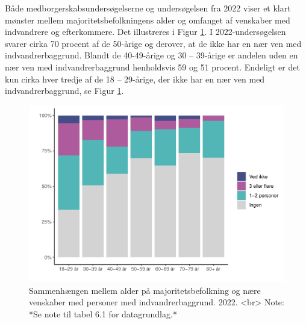 \documentclass[
]{book}
\begin{document}
Både medborgerskabsundersøgelserne og undersøgelsen fra 2022 viser et klart mønster mellem majoritetsbefolkningens alder og omfanget af venskaber med indvandrere og efterkommere. Det illustreres i Figur \ref{fig:fig-6-1}. I 2022-undersøgelsen svarer cirka 70 procent af de 50-årige og derover, at de ikke har en nær ven med indvandrerbaggrund. Blandt de 40-49-årige og 30 -- 39-årige er andelen uden en nær ven med indvandrerbaggrund henholdsvis 59 og 51 procent. Endeligt er det kun cirka hver tredje af de 18 -- 29-årige, der ikke har en nær ven med indvandrerbaggrund, se Figur \ref{fig:fig-6-1}.

\begin{figure}
\includegraphics[width=1\linewidth]{en-befolkning-blander-sig_files/figure-latex/fig-6-1-1} \caption{Sammenhængen mellem alder på majoritetsbefolkning og nære venskaber med personer med indvandrerbaggrund. 2022. <br> Note: *Se note til tabel 6.1 for datagrundlag.*}\label{fig:fig-6-1}
\end{figure}
\end{document}
